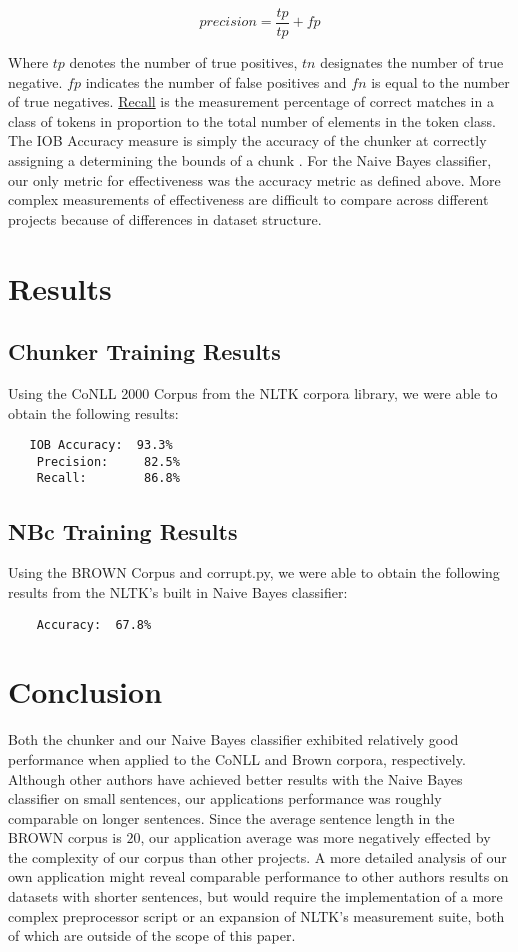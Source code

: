 \documentclass{article}
\begin{document}
$$precision =  \frac{tp}{tp} + fp$$

Where $tp$ denotes the number of true positives, $tn$ designates the number of true negative. $fp$ indicates the number of false positives and $fn$ is equal to the number of true negatives. \underline{Recall} is the measurement percentage of correct matches in a class of tokens in proportion to the total number of elements in the token class.   The IOB Accuracy measure is simply the accuracy of the chunker at correctly assigning a determining the bounds of a chunk \citep{NLTKCH7}. For the Naive Bayes classifier, our only metric for effectiveness was the accuracy metric as defined above. More complex measurements of effectiveness are difficult to compare across different projects because of differences in dataset structure.

\section{Results}
\subsection{Chunker Training Results}
Using the CoNLL 2000 Corpus from the NLTK corpora library, we were able to obtain the following results:
\begin{lstlisting}
   IOB Accuracy:  93.3%
    Precision:     82.5%
    Recall:        86.8%
\end{lstlisting}

\subsection{NBc Training Results}
Using the BROWN Corpus and corrupt.py, we were able to obtain the following results from the NLTK's built in Naive Bayes classifier:
\begin{lstlisting}
    Accuracy:  67.8%
\end{lstlisting}
\section{Conclusion}
Both the chunker and our Naive Bayes classifier exhibited relatively good performance when applied to the CoNLL and Brown corpora, respectively. Although other authors have achieved better results with the Naive Bayes classifier \citep{Ryerson} \citep{Smith_grammarinference} on small sentences, our applications performance was roughly comparable on longer sentences. Since the average sentence length in the BROWN corpus is $20$, our application average was more negatively effected by the complexity of our corpus than other projects. A more detailed analysis of our own application might reveal comparable performance to other authors results on datasets with shorter sentences, but would require the implementation of a more complex preprocessor script or an expansion of NLTK's measurement suite, both of which are outside of the scope of this paper. 
\end{document}
